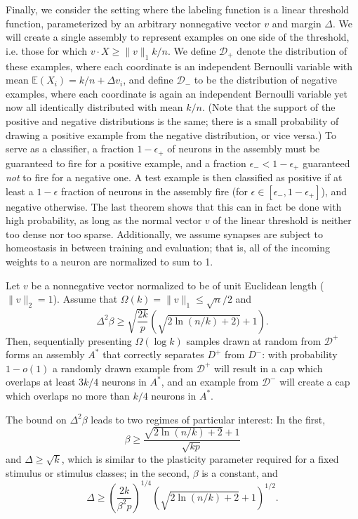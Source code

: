 \documentclass[final,12pt]{colt2022} %
\newcommand{\E}{\mathbb{E}}
\newcommand{\assmcore}[1]{{#1}^*}
\begin{document}
Finally, we consider the setting where the labeling function is a linear threshold function, parameterized by an arbitrary nonnegative vector $v$ and margin $\Delta$. We will create a single assembly to represent examples on one side of the threshold, i.e. those for which $v \cdot X \ge  \|v\|_1 k / n$. We define $\mathcal D_+$ denote the distribution of these examples, where each coordinate is an independent Bernoulli variable with mean $\E(X_i) = k/n + \Delta v_i$, and define $\mathcal D_-$ to be the distribution of negative examples, where each coordinate is again an independent Bernoulli variable yet now all identically distributed with mean $k/n$. (Note that the support of the positive and negative distributions is the same; there is a small probability of drawing a positive example from the negative distribution, or vice versa.) To serve as a classifier, a fraction $1- \epsilon_+$ of neurons in the assembly must be guaranteed to fire for a positive example, and a fraction $\epsilon_- < 1 - \epsilon_+$ guaranteed \emph{not} to fire for a negative one. A test example is then classified as positive if at least a $1 - \epsilon$ fraction of neurons in the assembly fire (for $\epsilon \in [\epsilon_-, 1 - \epsilon_+]$), and negative otherwise. The last theorem shows that this can in fact be done with high probability, as long as the normal vector $v$ of the linear threshold is neither too dense nor too sparse. Additionally, we assume synapses are subject to homeostasis in between training and evaluation; that is, all of the incoming weights to a neuron are normalized to sum to 1.
\begin{theorem}\label{theorem:halfspace}
Let $v$ be a nonnegative vector normalized to be of unit Euclidean length ($\|v\|_2 = 1$). Assume that  $\Omega(k) = \|v\|_1 \le \sqrt{n}/2$ and 
\[\Delta^2\beta \ge \sqrt{\frac{2k}{p}}(\sqrt{2\ln(n/k)+2)} + 1).\] 
Then,
sequentially presenting $\Omega(\log k)$ samples drawn at random from $\mathcal D^+$ forms an assembly $\assmcore{A}$ that correctly separates $D^+$ from $D^-$: with probability $1-o(1)$ a randomly drawn example from $\mathcal D^+$ will result in a cap which overlaps at least $3k/4$ neurons in $\assmcore{A}$, and an example from $\mathcal D^-$ will create a cap which overlaps no more than $k/4$ neurons in $\assmcore{A}$.
\end{theorem}

\begin{remark}
The bound on $\Delta^2 \beta$ leads to two regimes of particular interest: In the first, \[\beta \ge \frac{\sqrt{2\ln(n/k) + 2} + 1}{\sqrt{kp}}\] and $\Delta \ge \sqrt{k}$, which is similar to the plasticity parameter required for a fixed stimulus \citep{papadimitriou2019random} or stimulus classes; in the second, $\beta$ is a constant, and \[\Delta \ge \left(\frac{2k}{\beta^2 p}\right)^{1/4}\left(\sqrt{2\ln(n/k)+2} +1\right)^{1/2}.\]
\end{remark}
\end{document}
